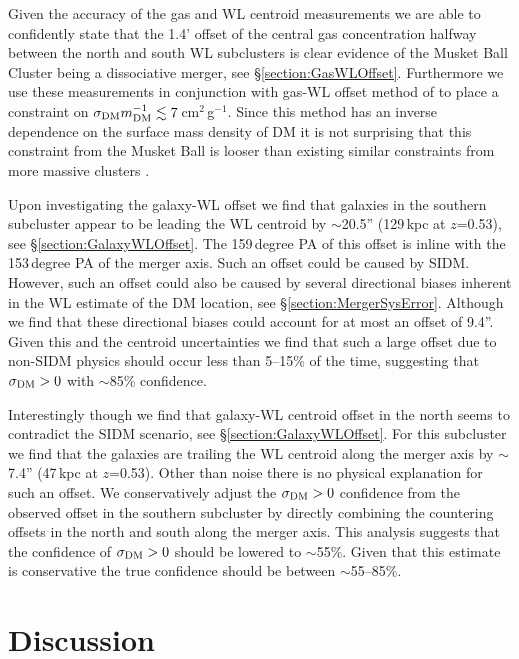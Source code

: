 Given the accuracy of the gas and WL centroid measurements we are able to confidently state that the 1.4' offset of the central gas concentration halfway between the north and south WL subclusters is clear evidence of the Musket Ball Cluster being a dissociative merger, see \S\ref{section:GasWLOffset}.
Furthermore we use these measurements in conjunction with gas-WL offset method of \citet{Markevitch:2004dl} to place a constraint on $\sigma_{\rm DM} m_{\rm DM}^{-1} \lesssim 7$\,cm$^2$\,g$^{-1}$.
Since this method has an inverse dependence on the surface mass density of DM it is not surprising that this constraint from the Musket Ball is looser than existing similar constraints from more massive clusters \citep{Markevitch:2004dl, Bradac:2008gw, Merten:2011gu}.

Upon investigating the galaxy-WL offset we find that galaxies in the southern subcluster appear to be leading the WL centroid by $\sim$20.5'' (129\,kpc at $z$=0.53), see \S\ref{section:GalaxyWLOffset}.
The 159\,degree PA of this offset is inline with the 153\,degree PA of the merger axis.
Such an offset could be caused by SIDM.
However, such an offset could also be caused by several directional biases inherent in the WL estimate of the DM location, see \S\ref{section:MergerSysError}.
Although we find that these directional biases could account for at most an offset of 9.4''.
Given this and the centroid uncertainties we find that such a large offset due to non-SIDM physics should occur less than 5--15\% of the time, suggesting that $\sigma_{\rm DM}>0$ with $\sim$85\% confidence.

Interestingly though we find that galaxy-WL centroid offset in the north seems to contradict the SIDM scenario, see \S\ref{section:GalaxyWLOffset}.
For this subcluster we find that the galaxies are trailing the WL centroid along the merger axis by $\sim$7.4'' (47\,kpc at $z$=0.53).
Other than noise there is no physical explanation for such an offset.
We conservatively adjust the $\sigma_{\rm DM}>0$ confidence from the observed offset in the southern subcluster by directly combining the countering offsets in the north and south along the merger axis.
This analysis suggests that the confidence of $\sigma_{\rm DM}>0$ should be lowered to $\sim$55\%.
Given that this estimate is conservative the true confidence should be between $\sim$55--85\%.


\section{Discussion}

